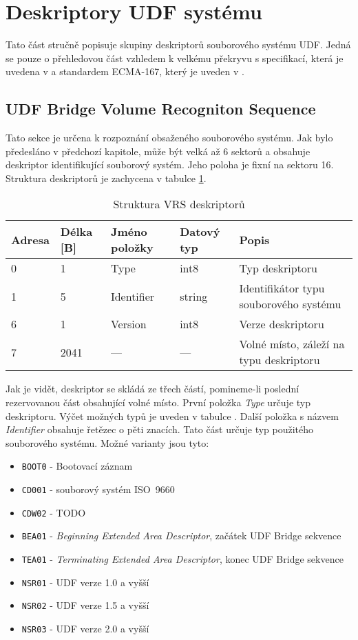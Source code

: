 \section{Deskriptory UDF systému}
Tato část stručně popisuje skupiny deskriptorů souborového systému UDF. Jedná se pouze o přehledovou část vzhledem k velkému překryvu s specifikací, která je uvedena v \cite{osta-udf-0201} a standardem ECMA-167, který je uveden v \cite{ecma-167}.

\subsection{UDF Bridge Volume Recogniton Sequence}
\label{sec:vrs}
Tato sekce je určena k rozpoznání obsaženého souborového systému. Jak bylo předesláno v předchozí kapitole, může být velká až 6 sektorů a obsahuje deskriptor identifikující souborový systém. Jeho poloha je fixní na sektoru 16.\\
Struktura deskriptorů je zachycena v tabulce \ref{tab:vrs}.
\begin{table}
    \begin{tabular}{ | l | l | l | l | l | }
        \hline
        Adresa  & Délka [B]   & Jméno položky & Datový typ    & Popis \\ \hline
        0       & 1             & Type           & int8          & Typ deskriptoru \\ \hline
        1       & 5             & Identifier & string        & Identifikátor typu souborového systému \\ \hline
        6       & 1             & Version         & int8          & Verze deskriptoru \\ \hline
        7       & 2041          & ---           & ---           & Volné místo, záleží na typu deskriptoru \\ \hline
    \end{tabular}
    \caption{Struktura VRS deskriptorů\label{tab:vrs}}
\end{table}
Jak je vidět, deskriptor se skládá ze třech částí, pomineme-li poslední rezervovanou část obsahující volné místo. První položka \textit{Type} určuje typ deskriptoru. Výčet možných typů je uveden v tabulce . Další položka s názvem \textit{Identifier} obsahuje řetězec o pěti znacích. Tato část určuje typ použitého souborového systému. Možné varianty jsou tyto:
\begin{itemize}
    \item \texttt{BOOT0} - Bootovací záznam
    \item \texttt{CD001} - souborový systém ISO~9660
    \item \texttt{CDW02} - TODO
    \item \texttt{BEA01} - \textit{Beginning Extended Area Descriptor}, začátek UDF Bridge sekvence
    \item \texttt{TEA01} - \textit{Terminating Extended Area Descriptor}, konec UDF Bridge sekvence
    \item \texttt{NSR01} - UDF verze 1.0 a vyšší
    \item \texttt{NSR02} - UDF verze 1.5 a vyšší
    \item \texttt{NSR03} - UDF verze 2.0 a vyšší
\end{itemize}
